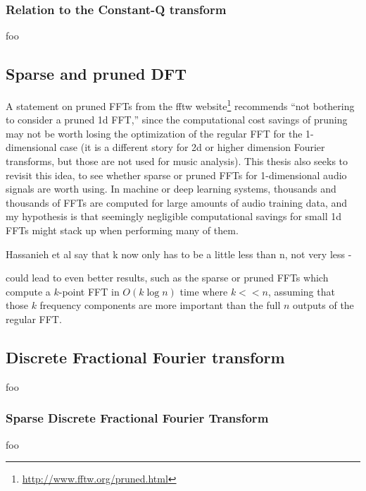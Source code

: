 \documentclass[letter,12pt,notitlepage]{article}
\begin{document}

\subsubsection{Relation to the Constant-Q transform}

foo

\subsection{Sparse and pruned DFT}

A statement on pruned FFTs from the fftw website\footnote{\href{http://www.fftw.org/pruned.html}{http://www.fftw.org/pruned.html}} recommends ``not bothering to consider a pruned 1d FFT,'' since the computational cost savings of pruning may not be worth losing the optimization of the regular FFT for the 1-dimensional case (it is a different story for 2d or higher dimension Fourier transforms, but those are not used for music analysis). This thesis also seeks to revisit this idea, to see whether sparse or pruned FFTs for 1-dimensional audio signals are worth using. In machine or deep learning systems, thousands and thousands of FFTs are computed for large amounts of audio training data, and my hypothesis is that seemingly negligible computational savings for small 1d FFTs might stack up when performing many of them.

Hassanieh et al say that k now only has to be a little less than n, not very less - 

 could lead to even better results, such as the sparse or pruned FFTs which compute a $k$-point FFT in $O(k \log n)$ time where $k << n$, assuming that those $k$ frequency components are more important than the full $n$ outputs of the regular FFT.



\subsection{Discrete Fractional Fourier transform}

foo

\subsubsection{Sparse Discrete Fractional Fourier Transform}

foo

\vfill
\clearpage
\end{document}
